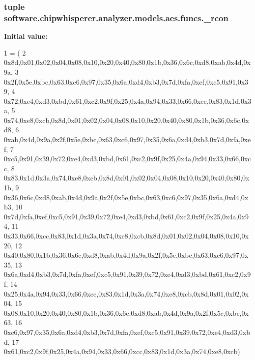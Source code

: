 \subsubsection[{\+\_\+rcon}]{\setlength{\rightskip}{0pt plus 5cm}tuple software.\+chipwhisperer.\+analyzer.\+models.\+aes.\+funcs.\+\_\+rcon}\label{namespacesoftware_1_1chipwhisperer_1_1analyzer_1_1models_1_1aes_1_1funcs_a10ce65402519f249cdb42f3a22b50d14}
{\bfseries Initial value\+:}
\begin{DoxyCode}
1 = (
2 0x8d,0x01,0x02,0x04,0x08,0x10,0x20,0x40,0x80,0x1b,0x36,0x6c,0xd8,0xab,0x4d,0x9a,
3 0x2f,0x5e,0xbc,0x63,0xc6,0x97,0x35,0x6a,0xd4,0xb3,0x7d,0xfa,0xef,0xc5,0x91,0x39,
4 0x72,0xe4,0xd3,0xbd,0x61,0xc2,0x9f,0x25,0x4a,0x94,0x33,0x66,0xcc,0x83,0x1d,0x3a,
5 0x74,0xe8,0xcb,0x8d,0x01,0x02,0x04,0x08,0x10,0x20,0x40,0x80,0x1b,0x36,0x6c,0xd8,
6 0xab,0x4d,0x9a,0x2f,0x5e,0xbc,0x63,0xc6,0x97,0x35,0x6a,0xd4,0xb3,0x7d,0xfa,0xef,
7 0xc5,0x91,0x39,0x72,0xe4,0xd3,0xbd,0x61,0xc2,0x9f,0x25,0x4a,0x94,0x33,0x66,0xcc,
8 0x83,0x1d,0x3a,0x74,0xe8,0xcb,0x8d,0x01,0x02,0x04,0x08,0x10,0x20,0x40,0x80,0x1b,
9 0x36,0x6c,0xd8,0xab,0x4d,0x9a,0x2f,0x5e,0xbc,0x63,0xc6,0x97,0x35,0x6a,0xd4,0xb3,
10 0x7d,0xfa,0xef,0xc5,0x91,0x39,0x72,0xe4,0xd3,0xbd,0x61,0xc2,0x9f,0x25,0x4a,0x94,
11 0x33,0x66,0xcc,0x83,0x1d,0x3a,0x74,0xe8,0xcb,0x8d,0x01,0x02,0x04,0x08,0x10,0x20,
12 0x40,0x80,0x1b,0x36,0x6c,0xd8,0xab,0x4d,0x9a,0x2f,0x5e,0xbc,0x63,0xc6,0x97,0x35,
13 0x6a,0xd4,0xb3,0x7d,0xfa,0xef,0xc5,0x91,0x39,0x72,0xe4,0xd3,0xbd,0x61,0xc2,0x9f,
14 0x25,0x4a,0x94,0x33,0x66,0xcc,0x83,0x1d,0x3a,0x74,0xe8,0xcb,0x8d,0x01,0x02,0x04,
15 0x08,0x10,0x20,0x40,0x80,0x1b,0x36,0x6c,0xd8,0xab,0x4d,0x9a,0x2f,0x5e,0xbc,0x63,
16 0xc6,0x97,0x35,0x6a,0xd4,0xb3,0x7d,0xfa,0xef,0xc5,0x91,0x39,0x72,0xe4,0xd3,0xbd,
17 0x61,0xc2,0x9f,0x25,0x4a,0x94,0x33,0x66,0xcc,0x83,0x1d,0x3a,0x74,0xe8,0xcb)
\end{DoxyCode}
\hypertarget{namespacesoftware_1_1chipwhisperer_1_1analyzer_1_1models_1_1aes_1_1funcs_a2cd6538808d4909bc9be0b9a87bc8f1d}{}

